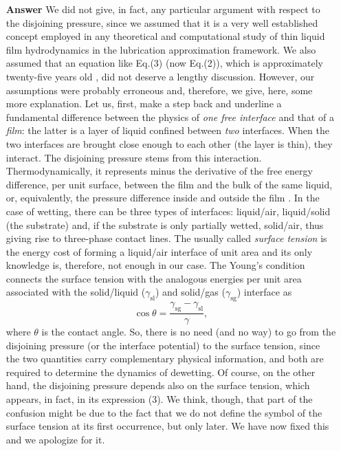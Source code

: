 \documentclass[12pt,english]{article}
\begin{document}
\begin{itemize}
\item[ \textbf{{Answer}}]
{
We did not give, in fact, any particular argument with respect to the disjoining pressure, since 
we assumed that it is a very well established concept employed in any theoretical and computational study of thin liquid film hydrodynamics in the lubrication approximation framework.
We also assumed that an equation like Eq.(3) (now Eq.(2)), which is approximately twenty-five years old \cite{SCHWARTZ1998173,Mitlin94}, did not deserve a lengthy discussion.
However, our assumptions were probably erroneous and, therefore, we give, here, some more explanation. 
Let us, first, make a step back and underline a fundamental difference between the physics of {\it one free interface} and that of a {\it film}:
the latter is a layer of liquid confined between {\it two} interfaces. When the two interfaces are brought close enough to each other (the layer is thin), they interact.
The disjoining pressure stems from this interaction. Thermodynamically, it represents minus the derivative of the free energy difference, per unit surface, between 
the film and the bulk of the same liquid, or, equivalently, the pressure difference inside and outside the film 
\cite{Deryaguin1940,DeryaguinChuraev1978}.
In the case of wetting, there can be three types of interfaces: liquid/air, liquid/solid (the substrate) and, 
if the substrate is only partially wetted, solid/air, thus giving rise to three-phase contact lines. 
The usually called {\it surface tension} is the energy cost of forming a liquid/air interface of unit area and its only knowledge is, therefore, not enough in our case. 
The Young's condition \cite{Young1805,DeGennes1985} connects the surface tension with the analogous energies per unit
area associated with the solid/liquid ($\gamma_{\text{sl}}$) and solid/gas ($\gamma_{\text{sg}}$) interface as
\begin{equation}
\cos \theta = \frac{\gamma_{\text{sg}}-\gamma_{\text{sl}}}{\gamma},
\end{equation}
where $\theta$ is the contact angle.
So, there is no need (and no way) to go from the disjoining pressure (or the interface potential) to the surface tension, since the two quantities carry complementary physical information,
and both are required to determine the dynamics of dewetting.
Of course, on the other hand, the disjoining pressure depends also on the surface tension, which appears, in fact, in its expression (3). 
We think, though, that part of the confusion might be due to the fact that we do not define the symbol of the surface tension at its first occurrence, but only later. 
We have now fixed this and we apologize for it.
}


\end{itemize}
\end{document}
